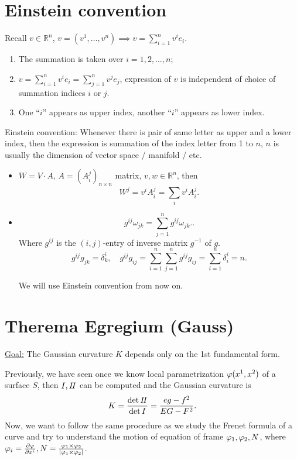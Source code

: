 \section{Einstein convention}

Recall \(v\in \mathbb{R}^n\), \(v=(v^1,\ldots,v^n)\implies v=\sum_{i=1}^n v^i e_i\).
\begin{enumerate}[(1)]
    \item The summation is taken over \(i=1,2,\ldots,n\);
    \item \(v=\sum_{i=1}^n v^ie_i=\sum_{j=1}^nv^je_j\), expression of \(v\) is
        independent of choice of summation indices \(i\) or \(j\).
    \item One ``\(i\)'' appears as upper index, another ``\(i\)'' appears as lower
        index.
\end{enumerate}

Einstein convention: Whenever there is pair of same letter as upper and a lower
index, then the expression is summation of the index letter from 1 to \(n\),
\(n\) is usually the dimension of vector space / manifold / etc.

\begin{example}
\begin{itemize}
    \item \(W=V\cdot A\), \(A=(A_i^j)_{n\times n}\) matrix, \(v,w\in \mathbb{R}^n\),
        then \[
            W^j=v^i A_i^j=\sum_{i}v^iA_i^j
        .\] 
    \item \[
        g^{ij}\omega_{jk}=\sum_{j=1}^n g^{ij}\omega_{jk}.
    .\] Where \(g^{ij}\) is the \((i,j)\)-entry of inverse matrix \(g^{-1}\) of
    \(g\). \ie\ \[
        g^{ij}g_{jk}=\delta^i_k,
        \quad g^{ij}g_{ij}=\sum_{i=1}^n \sum_{j=1}^{n}g^{ij}g_{ij}
        =\sum_{i=1}^{n}\delta^i_i=n
    .\] 

    We will use Einstein convention from now on.
\end{itemize}
\end{example}

\section{Therema Egregium (Gauss)}

\underline{Goal:} The Gaussian curvature \(K\) depends only on the 1st fundamental
form.

Previously, we have seen once we know local parametrization \(\varphi(x^1,x^2)\) of
a surface \(S\), then \(I,I\!I\) can be computed and the Gaussian curvature is \[
    K=\frac{\det I\!I}{\det I}=\frac{eg-f^2}{EG-F^2}
.\] Now, we want to follow the same procedure as we study the Frenet formula of a
curve and try to understand the motion of equation of frame \(\varphi_1,\varphi_2,N\),
where \(\varphi_i=\pdv{\varphi}{x^i}, N=\frac{\varphi_1\times \varphi_2}{|\varphi_1\times 
\varphi_2|}\).

